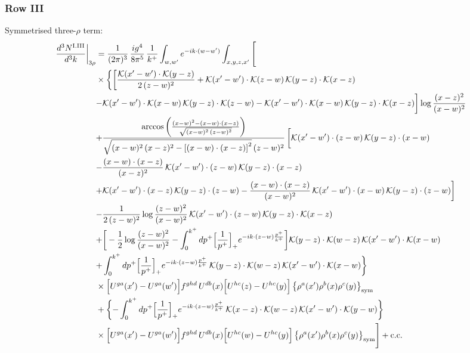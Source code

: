 \documentclass[9pt]{article}
\numberwithin{equation}{section}
\begin{document}
\subsubsection*{Row III}
Symmetrised three-$\rho$ term:
\begin{align}
\frac{d^{3}N^{\rm I.III}}{d^{3}k}\bigg|_{3\rho}&=\frac{1}{(2\pi)^{3}}\,\frac{ig^{4}}{8\pi^{5}}\,\frac{1}{k^{+}}\int_{w,w'}e^{-ik\cdot{(w-w')}}\int_{x,y,z,x'}\Bigg[\notag\\
&\times\bigg\{{\bigg[\frac{\mathcal{K}(x'-w')\cdot\mathcal{K}(y-z)}{2\,(z-w)^{2}}+\mathcal{K}(x'-w')\cdot\mathcal{K}(z-w)\,\mathcal{K}(y-z)\cdot\mathcal{K}(x-z)}\notag\\
&{-\mathcal{K}(x'-w')\cdot\mathcal{K}(x-w)\,\mathcal{K}(y-z)\cdot\mathcal{K}(z-w)-\mathcal{K}(x'-w')\cdot\mathcal{K}(x-w)\,\mathcal{K}(y-z)\cdot\mathcal{K}(x-z)\bigg]\log\frac{(x-z)^{2}}{(x-w)^{2}}}\notag\\
&{+\frac{\arccos\left(\frac{(x-w)^{2}-(x-w)\cdot (x-z)}{\sqrt{(x-w)^{2}\,(z-w)^{2}}}\right)}{\sqrt{(x-w)^{2}\,(x-z)^{2}-\left[(x-w)\cdot (x-z)\right]^{2}}\,(z-w)^{2}}\,\bigg[\mathcal{K}(x'-w')\cdot(z-w)\,\mathcal{K}(y-z)\cdot(x-w)}\notag\\
&{-\frac{(x-w)\cdot(x-z)}{(x-z)^{2}}\,\mathcal{K}(x'-w')\cdot(z-w)\,\mathcal{K}(y-z)\cdot(x-z)}\notag\\
&{+\mathcal{K}(x'-w')\cdot(x-z)\,\mathcal{K}(y-z)\cdot(z-w)-\frac{(x-w)\cdot(x-z)}{(x-w)^{2}}\,\mathcal{K}(x'-w')\cdot(x-w)\,\mathcal{K}(y-z)\cdot(z-w)\bigg]}\notag\\
&{-\frac{1}{2\,(z-w)^{2}}\log\frac{(z-w)^{2}}{(x-w)^{2}}\,\mathcal{K}(x'-w')\cdot(z-w)\,\mathcal{K}(y-z)\cdot\mathcal{K}(x-z)}\notag\\
&{+\bigg[-\frac{1}{2}\log\frac{(z-w)^{2}}{(x-w)^{2}}-\int_{0}^{k^{+}}dp^{+}\Big[\frac{1}{p^{+}}\Big]_{+}e^{-ik\cdot{(z-w)}\frac{p^{+}}{k^{+}}}\bigg]\mathcal{K}(y-z)\cdot\mathcal{K}(w-z)\,\mathcal{K}(x'-w')\cdot\mathcal{K}(x-w)}\notag\\
&{+\int_{0}^{k^{+}}dp^{+}\Big[\frac{1}{p^{+}}\Big]_{+}e^{-ik\cdot{(z-w)}\frac{p^{+}}{k^{+}}}\,\mathcal{K}(y-z)\cdot\mathcal{K}(w-z)\,\mathcal{K}(x'-w')\cdot\mathcal{K}(x-w)}\bigg\}\notag\\
&\times \Big[U^{ga}(x')-U^{ga}(w')\Big]f^{ghd}\,U^{db}(x)\Big[U^{hc}(z)-U^{hc}(y)\Big]\,\big\{\rho^{a}(x')\rho^{b}(x)\rho^{c}(y)\big\}_{\rm sym}\notag\\
&+\bigg\{{-\int_{0}^{k^{+}}dp^{+}\Big[\frac{1}{p^{+}}\Big]_{+}e^{-ik\cdot{(z-w)}\frac{p^{+}}{k^{+}}}\,\mathcal{K}(x-z)\cdot\mathcal{K}(w-z)\,\mathcal{K}(x'-w')\cdot\mathcal{K}(y-w)}\bigg\}\notag\\
&\times \Big[U^{ga}(x')-U^{ga}(w')\Big]f^{ghd}\,U^{db}(x)\Big[U^{hc}(w)-U^{hc}(y)\Big]\,\big\{\rho^{a}(x')\rho^{b}(x)\rho^{c}(y)\big\}_{\rm sym}\Bigg]+{\rm c.c.}\label{eq:D-I.III-3}
\end{align}
\end{document}
